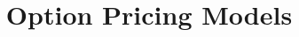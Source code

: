 \documentclass{article}
\begin{document}
\title{Option Pricing Models}
\author{}
\date{}
\maketitle





%

\end{document}
